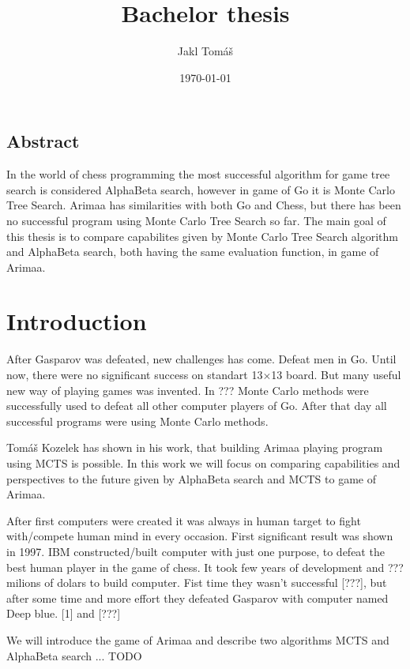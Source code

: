 \documentclass[12pt,titlepage,fleqn]{report}
\title{Bachelor thesis}
\author{Jakl Tomáš}
\date{\today}
\begin{document}
\maketitle
\tableofcontents
\newpage

\section{Abstract}
In the world of chess programming the most successful algorithm for game tree
search is considered AlphaBeta search, however in game of Go it is Monte
Carlo Tree Search. Arimaa has similarities with both Go and Chess, but there
has been no successful program using Monte Carlo Tree Search so far. The main
goal of this thesis is to compare capabilites given by Monte Carlo Tree Search
algorithm and AlphaBeta search, both having the same evaluation function, in
game of Arimaa.

\chapter{Introduction}
After Gasparov was defeated, new challenges has come. Defeat men in Go. Until
now, there were no significant success on standart 13$\times$13 board. But many
useful new way of playing games was invented. In ??? Monte Carlo methods were
successfully used to defeat all other computer players of Go. After that day
all successful programs were using Monte Carlo methods.

Tomáš Kozelek has shown in his work, that building Arimaa playing program using
MCTS is possible. In this work we will focus on comparing capabilities and
perspectives to the future given by AlphaBeta search and MCTS to game of
Arimaa.

After first computers were created it was always in human target to fight
with/compete human mind in every occasion. First significant result was shown
in 1997. IBM constructed/built computer with just one purpose, to defeat
the best human player in the game of chess. It took few years of development
and ??? milions of dolars to build computer. Fist time they wasn't successful
[???], but after some time and more effort they defeated Gasparov with computer
named Deep blue.
[1] and [???]

We will introduce the game of Arimaa and describe two algorithms \ac{MCTS} and AlphaBeta search ... TODO
\end{document}
